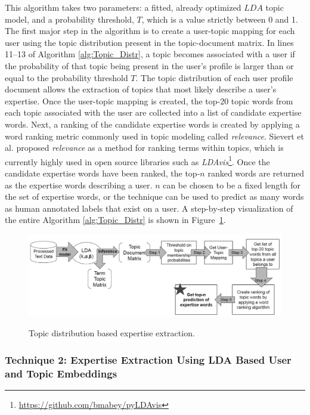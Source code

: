            This algorithm takes two parameters: a fitted, already optimized $LDA$ topic model, and a probability threshold, $T$, which is a value strictly between 0 and 1. The first major step in the algorithm is to create a user-topic mapping for each user using the topic distribution present in the topic-document matrix. In lines 11--13 of Algorithm \ref{alg:Topic_Distr}, a topic becomes associated with a user if the probability of that topic being present in the user's profile is larger than or equal to the probability threshold $T$. The topic distribution of each user profile document allows the extraction of topics that most likely describe a user's expertise. Once the user-topic mapping is created, the top-20 topic words from each topic associated with the user are collected into a list of candidate expertise words. Next, a ranking of the candidate expertise words is created by applying a word ranking metric commonly used in topic modeling called \emph{relevance}. Sievert et al. \cite{sievert2014ldavis} proposed \emph{relevance} as a method for ranking terms within topics, which is currently highly used in open source libraries such as \emph{LDAvis}\footnote{\url{https://github.com/bmabey/pyLDAvis}}. Once the candidate expertise words have been ranked, the top-$n$ ranked words are returned as the expertise words describing a user. $n$ can be chosen to be a fixed length for the set of expertise words, or the technique can be used to predict as many words as human annotated labels that exist on a user. A step-by-step visualization of the entire Algorithm \ref{alg:Topic_Distr} is shown in Figure~\ref{fig:technique1}.
            
            \begin{figure}[!ht]
              \centering
              \includegraphics[width=\textwidth]{figures/technique1.JPG}\\
              \caption{Topic distribution based expertise extraction.}
              \label{fig:technique1}
            \end{figure}
            
        \subsubsection{Technique 2: Expertise Extraction Using LDA Based User and Topic Embeddings\label{sec:LDAbased_technique}}
        
